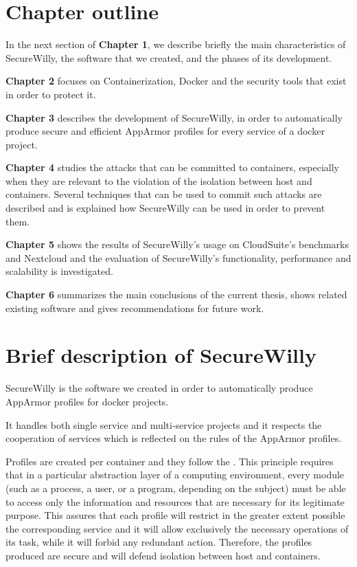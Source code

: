 \section{Chapter outline}
In the next section of \textbf{Chapter 1}, we describe briefly the main characteristics of SecureWilly, the software that we created, and the phases of its development.

\textbf{Chapter 2}  focuses on Containerization, Docker and the security tools that exist in order to protect it.

\textbf{Chapter 3} describes the development of SecureWilly, in order to automatically produce secure and efficient AppArmor profiles for every service of a docker project. 

\textbf{Chapter 4} studies the attacks that can be committed to containers, especially when they are relevant to the violation of the isolation between host and containers. Several techniques that can be used to commit such attacks are described and is explained how SecureWilly can be used in order to prevent them.

\textbf{Chapter 5} shows the results of SecureWilly's usage on CloudSuite's benchmarks and Nextcloud and the evaluation of SecureWilly's functionality, performance and scalability is investigated.

\textbf{Chapter 6} summarizes the main conclusions of the current thesis, shows related existing software and gives recommendations for future work. 

\section{Brief description of SecureWilly}
SecureWilly is the software we created in order to automatically produce AppArmor profiles for docker projects.

It handles both single service and multi-service projects and it respects the cooperation of services which is reflected on the rules of the AppArmor profiles.

Profiles are created per container and they follow the . This principle requires that in a particular abstraction layer of a computing environment, every module (such as a process, a user, or a program, depending on the subject) must be able to access only the information and resources that are necessary for its legitimate purpose. \cite{polp} This assures that each profile will restrict in the greater extent possible the corresponding service and it will allow exclusively the necessary operations of its task, while it will forbid any redundant action. Therefore, the profiles produced are secure and will defend isolation between host and containers.

